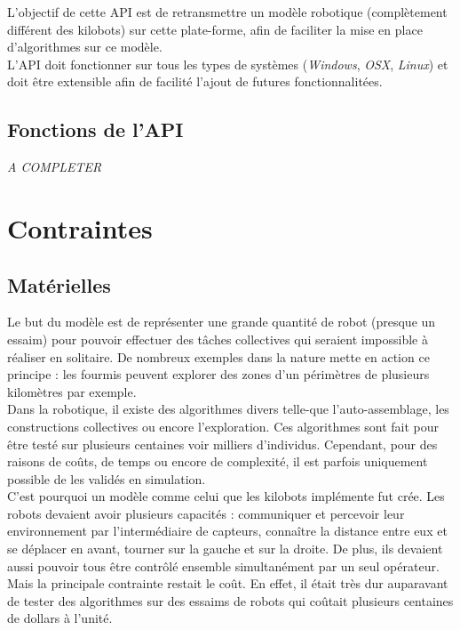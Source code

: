 \documentclass[a4paper,8pt]{report}
\begin{document}
\smallskip
L'objectif de cette API est de retransmettre un mod\`ele robotique (compl\`etement diff\'erent des kilobots) sur cette plate-forme, afin de faciliter la mise en place d'algorithmes sur ce mod\`ele.\\

\smallskip
L'API doit fonctionner sur tous les types de syst\`emes (\textit{Windows}, \textit{OSX}, \textit{Linux}) et doit \^etre extensible afin de facilit\'e l'ajout de futures fonctionnalit\'ees.\\

\section*{Fonctions de l'API}\label{sec:name}

\textit{A COMPLETER}

\chapter{Contraintes}

\section*{Mat\'erielles}\label{sec:name}

Le but du mod\`ele est de repr\'esenter une grande quantit\'e de robot (presque un essaim) pour pouvoir effectuer des t\^aches collectives qui seraient impossible \`a r\'ealiser en solitaire. De nombreux exemples dans la nature mette en action ce principe : les fourmis peuvent explorer des zones d'un p\'erim\`etres de plusieurs kilom\`etres par exemple. \\
Dans la robotique, il existe des algorithmes divers telle-que l'auto-assemblage, les constructions collectives ou encore l'exploration. 
Ces algorithmes sont fait pour \^etre test\'e sur plusieurs centaines voir milliers d'individus. Cependant, pour des raisons de co\^uts, de temps ou encore de complexit\'e, il est parfois uniquement possible de les valid\'es en simulation. \\
C'est pourquoi un mod\`ele comme celui que les kilobots impl\'emente fut cr\'ee. Les robots devaient avoir plusieurs capacit\'es : communiquer et percevoir leur environnement par l'interm\'ediaire de capteurs, conna\^itre la distance entre eux et se d\'eplacer en avant, tourner sur la gauche et sur la droite. De plus, ils devaient aussi pouvoir tous \^etre contr\^ol\'e ensemble simultan\'ement par un seul op\'erateur. Mais la principale contrainte restait le co\^ut. En effet, il \'etait tr\`es dur auparavant de tester des algorithmes sur des essaims de robots qui co\^utait plusieurs centaines de dollars \`a l'unit\'e.
\end{document}
